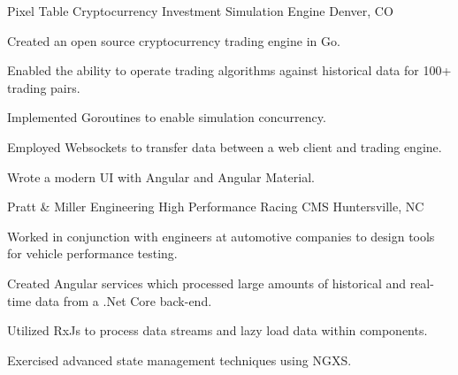

\begin{cventries}

    \cventry
    {Pixel Table} %
    {Cryptocurrency Investment Simulation Engine} %
    {Denver, CO} %
    {} %
    {
    \begin{cvitems} %
        \item {Created an open source cryptocurrency trading engine in Go.}
        \item {Enabled the ability to operate trading algorithms against historical data for 100+ trading pairs.}
        \item {Implemented Goroutines to enable simulation concurrency.}
        \item {Employed Websockets to transfer data between a web client and trading engine.}
        \item {Wrote a modern UI with Angular and Angular Material.}
    \end{cvitems}
    }

    \cventry
    {Pratt \& Miller Engineering} %
    {High Performance Racing CMS} %
    {Huntersville, NC} %
    {} %
    {
    \begin{cvitems} %
        \item {Worked in conjunction with engineers at automotive companies to design tools for vehicle performance testing.}
        \item {Created Angular services which processed large amounts of historical and real-time data from a .Net Core back-end.}
        \item {Utilized RxJs to process data streams and lazy load data within components.}
        \item {Exercised advanced state management techniques using NGXS.}
    \end{cvitems}
    }


\end{cventries}
